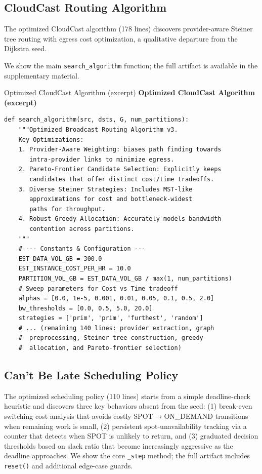 \documentclass[sigconf]{acmart}
\newenvironment{promptbox}[1][]{%
  \par\smallskip
  \def\promptboxtitle{#1}%
  \begin{snugshade}%
  \ifx\promptboxtitle\empty\else
    \noindent\textbf{\small\promptboxtitle}\par\nobreak\smallskip
  \fi
  \small\ttfamily\noindent\ignorespaces
}{%
  \end{snugshade}%
  \par\smallskip
}
\begin{document}
\subsection{CloudCast Routing Algorithm}
\label{app:sol-cloudcast}

The optimized CloudCast algorithm (178 lines) discovers provider-aware Steiner tree routing with egress cost optimization, a qualitative departure from the Dijkstra seed. 

We show the main \texttt{search\_algorithm} function; the full artifact is available in the supplementary material.

\begin{promptbox}[Optimized CloudCast Algorithm (excerpt)]
\begin{lstlisting}[aboveskip=0pt,belowskip=0pt,numbers=none,frame=none,backgroundcolor=\color{gray!5}]
def search_algorithm(src, dsts, G, num_partitions):
    """Optimized Broadcast Routing Algorithm v3.
    Key Optimizations:
    1. Provider-Aware Weighting: biases path finding towards
       intra-provider links to minimize egress.
    2. Pareto-Frontier Candidate Selection: Explicitly keeps
       candidates that offer distinct cost/time tradeoffs.
    3. Diverse Steiner Strategies: Includes MST-like
       approximations for cost and bottleneck-widest
       paths for throughput.
    4. Robust Greedy Allocation: Accurately models bandwidth
       contention across partitions.
    """
    # --- Constants & Configuration ---
    EST_DATA_VOL_GB = 300.0
    EST_INSTANCE_COST_PER_HR = 10.0
    PARTITION_VOL_GB = EST_DATA_VOL_GB / max(1, num_partitions)
    # Sweep parameters for Cost vs Time tradeoff
    alphas = [0.0, 1e-5, 0.001, 0.01, 0.05, 0.1, 0.5, 2.0]
    bw_thresholds = [0.0, 0.5, 5.0, 20.0]
    strategies = ['prim', 'prim', 'furthest', 'random']
    # ... (remaining 140 lines: provider extraction, graph
    #  preprocessing, Steiner tree construction, greedy
    #  allocation, and Pareto-frontier selection)
\end{lstlisting}
\end{promptbox}

\subsection{Can't Be Late Scheduling Policy}
\label{app:sol-cantbelate}

The optimized scheduling policy (110 lines) starts from a simple deadline-check heuristic and discovers three key behaviors absent from the seed: (1) break-even switching cost analysis that avoids costly SPOT$\to$ON\_DEMAND transitions when remaining work is small, (2) persistent spot-unavailability tracking via a counter that detects when SPOT is unlikely to return, and (3) graduated decision thresholds based on slack ratio that become increasingly aggressive as the deadline approaches. We show the core \texttt{\_step} method; the full artifact includes \texttt{reset()} and additional edge-case guards.
\end{document}
